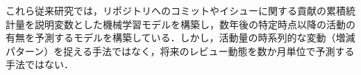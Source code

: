 \documentclass[submit]{ipsj}
\newcommand{\todo}[1]{\colorbox{yellow}{{\bf TODO}:}{\color{red} {\textbf{[#1]}}}}
\begin{document}
これら従来研究では，リポジトリへのコミットやイシューに関する貢献の累積統計量を説明変数とした機械学習モデルを構築し，数年後の特定時点以降の活動の有無を予測するモデルを構築している．しかし，活動量の時系列的な変動（増減パターン）を捉える手法ではなく，将来のレビュー動態を数か月単位で予測する手法ではない．



\end{document}
